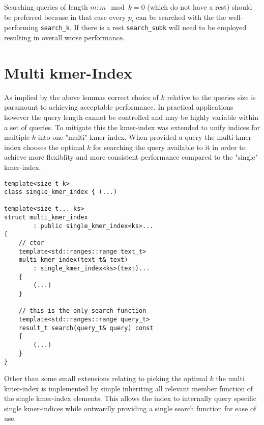 Searching queries of length $m:m\mod k=0$ (which do not have a rest)
should be preferred because in that case every $p_{i}$ can be searched with the the well-performing \lstinline{search_k}.
If there is a rest \lstinline{search_subk} will need to be employed resulting in overall worse performance.

\section{Multi kmer-Index}

As implied by the above lemmas correct choice of $k$ relative to the queries size is paramount to achieving acceptable
performance. In practical applications however the query length cannot be controlled and may be highly variable within
a set of queries. To mitigate this the kmer-index was extended to unify indices for multiple $k$
into one "multi" kmer-index. When provided a query the multi kmer-index chooses the optimal $k$ for searching the query available
to it in order to achieve more flexiblity and more consistent performance compared to the "single" kmer-index.

\begin{lstlisting}[caption={Class definition and constructor implementation of the (multi) kmer-index.},language={[GNU]C++},tabsize=2]
template<size_t k>
class single_kmer_index { (...)

template<size_t... ks>
struct multi_kmer_index
        : public single_kmer_index<ks>...
{
	// ctor
	template<std::ranges::range text_t>
	multi_kmer_index(text_t& text)
		: single_kmer_index<ks>(text)...
	{
		(...)
	}

	// this is the only search function
	template<std::ranges::range query_t>
	result_t search(query_t& query) const
	{
		(...)
	}
}

\end{lstlisting}
Other than some small extensions relating to picking the optimal $k$ the multi kmer-index is
implemented by simple inheriting all relevant member function of the single kmer-index elements. This allows the index
to internally query specific single kmer-indices while outwardly providing a single search function for ease of use.
